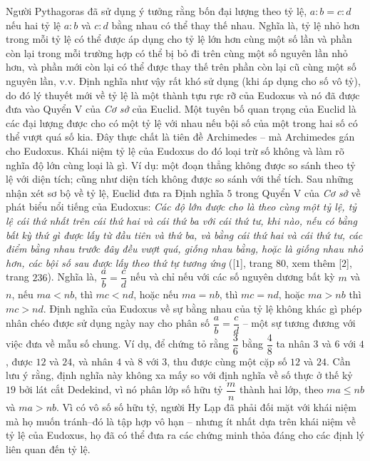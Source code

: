 \begin{multicols}{2}
	\vskip 0.1cm
	Người Pythagoras đã sử dụng ý tưởng rằng bốn đại lượng theo tỷ lệ, $a:b = c : d$  nếu hai tỷ lệ $a:b$  và $c:d$ bằng nhau có thể thay thế nhau. Nghĩa là, tỷ lệ nhỏ hơn trong mỗi tỷ lệ có thể được áp dụng cho tỷ lệ lớn hơn cùng một số lần và phần còn lại trong mỗi trường hợp có thể bị bỏ đi trên cùng một số nguyên lần nhỏ hơn, và phần mới còn lại có thể được thay thế trên phần còn lại cũ cùng một số nguyên lần, v.v. 
	\vskip 0.1cm
	Định nghĩa như vậy rất khó sử dụng (khi áp dụng cho số vô tỷ), do đó lý thuyết mới về tỷ lệ là một thành tựu rực rỡ của Eudoxus và nó đã được đưa vào Quyển V của \textit{Cơ sở} của Euclid.
	\vskip 0.1cm
	Một tuyên bố quan trọng của Euclid là các đại lượng được cho có một tỷ lệ với nhau nếu bội số của một trong hai số có thể vượt quá số kia. 
	\vskip 0.1cm
	Đây thực chất là tiên đề Archimedes -- mà Archimedes gán cho Eudoxus. Khái niệm tỷ lệ của Eudoxus do đó loại trừ số không và làm rõ nghĩa độ lớn cùng loại là gì. Ví dụ: một đoạn thẳng không được so sánh theo tỷ lệ với diện tích; cũng như diện tích không được so sánh với thể tích.
	\vskip 0.1cm
	Sau những nhận xét sơ bộ về tỷ lệ, Euclid đưa ra Định nghĩa $5$ trong Quyển V của \textit{Cơ sở} về phát biểu nổi tiếng của Eudoxus: \textit{Các độ lớn được cho là theo cùng một tỷ lệ, tỷ lệ cái thứ nhất trên cái thứ hai và cái thứ ba với cái thứ tư, khi nào, nếu có bằng bất kỳ thứ gì được lấy từ đầu tiên và thứ ba, và bằng cái thứ hai và cái thứ tư, các điểm bằng nhau trước đây đều vượt quá, giống nhau bằng, hoặc là giống nhau nhỏ hơn, các bội số sau được lấy theo thứ tự tương ứng} ([$1$], trang $80$, xem thêm [$2$], trang $236$).
	\vskip 0.1cm
	Nghĩa là, $\dfrac{a}{b} = \dfrac{c}{d}$  nếu và chỉ nếu với các số nguyên dương bất kỳ $m$  và $n$,  nếu $ma < nb$,  thì $mc < nd$,  hoặc nếu $ma = nb$,  thì $mc = nd$,  hoặc $ma > nb$  thì $mc > nd$. 
	\vskip 0.1cm
	Định nghĩa của Eudoxus về sự bằng nhau của tỷ lệ không khác gì phép nhân chéo được sử dụng ngày nay cho phân số $\dfrac{a}{b} = \dfrac{c}{d}$  -- một sự tương đương với việc đưa về mẫu số chung.  Ví dụ, để chứng tỏ rằng $\dfrac{3}{6}$  bằng $\dfrac{4}{8}$  ta nhân $3$ và $6$ với $4$, được $12$ và $24$, và nhân $4$ và $8$ với $3$, thu được cùng một cặp số $12$ và $24$.
	\vskip 0.1cm 
	Cần lưu ý rằng, định nghĩa này không xa mấy so với định nghĩa về số thực ở thế kỷ $19$ bởi lát cắt Dedekind, vì nó phân lớp số hữu tỷ  $\dfrac{m}{n}$  thành hai lớp, theo $ma \le nb$  và $ma > nb$.
	\vskip 0.1cm 
	Vì có vô số số hữu tỷ, người Hy Lạp đã phải đối mặt với khái niệm mà họ muốn tránh--đó là tập hợp vô hạn -- nhưng ít nhất dựa trên khái niệm về tỷ lệ của Eudoxus, họ đã có thể đưa ra các chứng minh thỏa đáng cho các định lý liên quan đến tỷ lệ.

\end{multicols}
